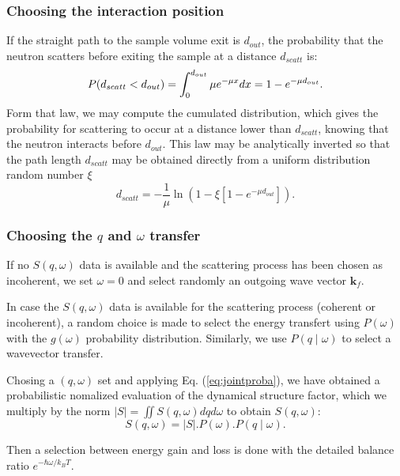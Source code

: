 \subsubsection{Choosing the interaction position}

If the straight path to the sample volume exit is $d_{out}$, the probability that the neutron scatters before exiting the sample at a distance $d_{scatt}$ is:
\begin{equation}
P(d_{scatt} < d_{out}) = \int_0^{d_{out}} \mu e^{-\mu x}dx = 1 - e^{-\mu d_{out}}. \\
\end{equation}
Form that law, we may compute the cumulated distribution, which gives the probability for scattering to occur at a distance lower than $d_{scatt}$, knowing that the neutron interacts before $d_{out}$. This law may be analytically inverted so that the path length $d_{scatt}$ may be obtained directly from a uniform distribution random number $\xi$
\begin{equation}
d_{scatt} = -\frac{1}{\mu} \ln(1 - \xi[1 -e^{-\mu d_{out}}]).
\end{equation}

\subsubsection{Choosing the $q$ and $\omega$ transfer}

If no $S(q, \omega)$ data is available and the scattering process has been chosen as incoherent, we set $\omega=0$ and select randomly an outgoing wave vector $\boldsymbol{k}_f$.

In case the $S(q, \omega)$ data is available for the scattering process (coherent or incoherent), a random choice is made to select the energy transfert using $P(\omega)$ with the $g(\omega)$ probability distribution.
Similarly, we use $P(q \mid \omega)$ to select a wavevector transfer.

Chosing a $(q, \omega)$ set and applying Eq. (\ref{eq:jointproba}), we have obtained a probabilistic nomalized evaluation of the dynamical structure factor, which we multiply by the norm $|S| = \iint S(q,\omega) dq d\omega$ to obtain $S(q, \omega)$:
\begin{equation}
S(q, \omega) = |S|. P(\omega).P(q \mid \omega) .
\end{equation}

Then a selection between energy gain and loss is done with the detailed balance ratio $e^{-\hbar \omega / k_B T}$.

